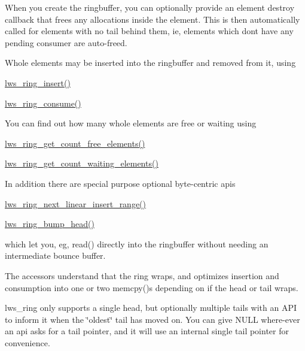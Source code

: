 When you create the ringbuffer, you can optionally provide an element destroy callback that frees any allocations inside the element. This is then automatically called for elements with no tail behind them, ie, elements which don\textquotesingle{}t have any pending consumer are auto-\/freed.

Whole elements may be inserted into the ringbuffer and removed from it, using


\begin{DoxyItemize}
\item \hyperlink{group__lws__ring_ga00fcaf9c2e3b16e9a667120ae214cc30}{lws\+\_\+ring\+\_\+insert()}
\item \hyperlink{group__lws__ring_ga1ad6706af708096eba401a48f67bf865}{lws\+\_\+ring\+\_\+consume()}
\end{DoxyItemize}

You can find out how many whole elements are free or waiting using


\begin{DoxyItemize}
\item \hyperlink{group__lws__ring_ga711d92a1046c2a34860a2babd68aec32}{lws\+\_\+ring\+\_\+get\+\_\+count\+\_\+free\+\_\+elements()}
\item \hyperlink{group__lws__ring_ga5e3cb460d9af061b5b60dc35d4e2ea95}{lws\+\_\+ring\+\_\+get\+\_\+count\+\_\+waiting\+\_\+elements()}
\end{DoxyItemize}

In addition there are special purpose optional byte-\/centric apis


\begin{DoxyItemize}
\item \hyperlink{group__lws__ring_ga7b61910109bce5a64a9cd411377ae7b1}{lws\+\_\+ring\+\_\+next\+\_\+linear\+\_\+insert\+\_\+range()}
\item \hyperlink{group__lws__ring_gaef516991b6b0268a639f76a01def2f87}{lws\+\_\+ring\+\_\+bump\+\_\+head()}
\end{DoxyItemize}

which let you, eg, read() directly into the ringbuffer without needing an intermediate bounce buffer.

The accessors understand that the ring wraps, and optimizes insertion and consumption into one or two memcpy()s depending on if the head or tail wraps.

lws\+\_\+ring only supports a single head, but optionally multiple tails with an A\+PI to inform it when the \char`\"{}oldest\char`\"{} tail has moved on. You can give N\+U\+LL where-\/ever an api asks for a tail pointer, and it will use an internal single tail pointer for convenience.

